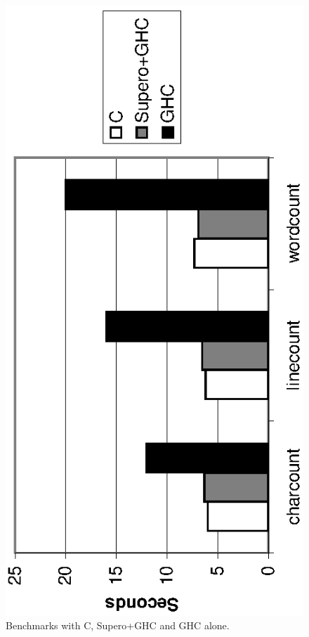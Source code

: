 \begin{figure}
\bigskip
\begin{center}
\includegraphics[scale=0.75,angle=270]{graphics/supero-wc.eps}
\end{center}
\bigskip
\caption{Benchmarks with C, Supero+GHC and GHC alone.}
\label{figS:c_results}
\end{figure}

